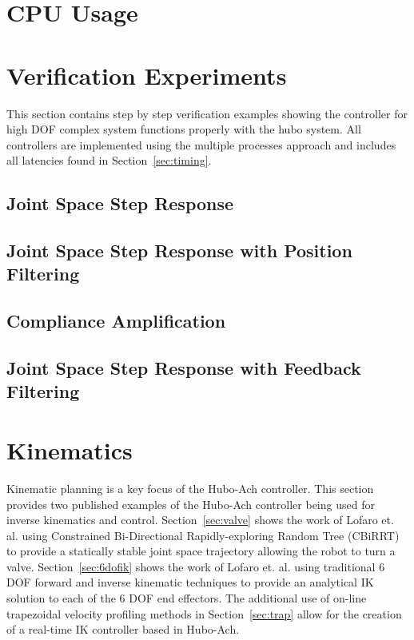 \section{CPU Usage}
	
\section{Verification Experiments}\label{sec:simpleExamples}
This section contains step by step verification examples showing the controller for high DOF complex system functions properly with the hubo system.
All controllers are implemented using the multiple processes approach and includes all latencies found in Section~\ref{sec:timing}.

	\subsection{Joint Space Step Response}\label{sec:singlejointStep}
		
	\subsection{Joint Space Step Response with Position Filtering}\label{sec:singlejointFilter}
		
	\subsection{Compliance Amplification}\label{sec:singlejointRefComplience}
		
	\subsection{Joint Space Step Response with Feedback Filtering}\label{sec:singlejointEnc}
		

\section{Kinematics}\label{sec:hubo-ach-kinimatics}
Kinematic planning is a key focus of the Hubo-Ach controller.
This section provides two published examples of the Hubo-Ach controller being used for inverse kinematics and control.
Section~\ref{sec:valve} shows the work of Lofaro et. al. \cite{lofaroTePRA2013Valve} using Constrained Bi-Directional Rapidly-exploring Random Tree (CBiRRT) to provide a statically stable joint space trajectory allowing the robot to turn a valve.
Section~\ref{sec:6dofik} shows the work of Lofaro et. al. \cite{lofaroTePRA2013HuboAch} using traditional 6 DOF forward and inverse kinematic techniques to provide an analytical IK solution to each of the 6 DOF end effectors.
The additional use of on-line trapezoidal velocity profiling methods in Section~\ref{sec:trap} allow for the creation of a real-time IK controller based in Hubo-Ach.


